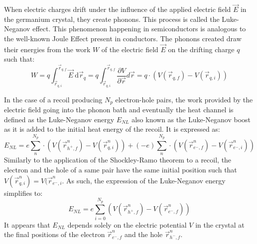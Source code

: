 When electric charges drift under the influence of the applied electric field $\vec{E}$ in the germanium crystal, they create phonons. This process is called the Luke-Neganov effect. This phenomenon happening in semiconductors is analogous to the well-known Joule Effect present in conductors. The phonons created draw their energies from the work $W$ of the electric field $\vec{E}$ on the drifting charge $q$ such that: 
\begin{equation}
W
=
q \int_{ \vec{r}_{q,i} }^{ \vec{r}_{q,f} } \vec{E} \ \mathrm{d}\vec{r}_q
=
q \int_{ \vec{r}_{q,i} }^{ \vec{r}_{q,f} } \frac{\partial V}{\partial \vec{r}} d\vec{r}
=
q \cdot \left( V(\vec{r}_{q,f}) - V(\vec{r}_{q,i}) \right)
\end{equation}

In the case of a recoil producing $N_p$ electron-hole pairs, the work provided by the electric field going into the phonon bath and eventually the heat channel is defined as the Luke-Neganov energy $E_{NL}$ also known as the Luke-Neganov boost as it is added to the initial heat energy of the recoil. It is expressed as:
\begin{equation}
E_{NL}
=
e \sum_{n}^{N_p} \cdot \left( V(\vec{r}_{h^+,f}^n) - V(\vec{r}_{q,i}^n) \right)
+ 
(- e) \sum_{n}^{N_p} \cdot \left( V(\vec{r}_{e^-,f}^n) - V(\vec{r}_{e^-,i}^n) \right)
\end{equation}
Similarly to the application of the Shockley-Ramo theorem to a recoil, the electron and the hole of a same pair have the same initial position such that $V(\vec{r}_{q,i}^n) = V(\vec{r}_{e^-,i}^n$. As such, the expression of the Luke-Neganov energy simplifies to:
\begin{equation}
E_{NL}
=
e \sum_{i=0}^{N_p} \left( V(\vec{r}_{h^+,f}^n) - V(\vec{r}_{e^-,f}^n) \right)
\end{equation}
It appears that $E_{NL}$ depends solely on the electric potential $V$ in the crystal at the final positions of the electron $\vec{r}_{e^-,f}^n$ and the hole $\vec{r}_{h^-,f}^n$.



